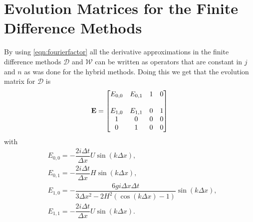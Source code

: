 \section{Evolution Matrices for the Finite Difference Methods}

By using \eqref{eqn:fourierfactor} all the derivative approximations in the finite difference methods $\mathcal{D}$ and $\mathcal{W}$ can be written as operators that are constant in $j$ and $n$ as was done for the hybrid methods. Doing this we get that the evolution matrix for $\mathcal{D}$ is 
\begin{equation}
\label{eqn:AppEvolD}
\mathbf{E} = \begin{bmatrix}
{E}_{0,0} & {E}_{0,1}  & 1 &0 \\ \\
{E}_{1,0} & {E}_{1,1}  & 0 &1 \\
1  & 0  &0 &0 \\
0  & 1  &0 &0 
\end{bmatrix} 
\end{equation}
with
\begin{align*}
&{E}_{0,0} = -  \dfrac{2 i\Delta t }{\Delta x} U\sin\left(k \Delta x\right) , \\
&{E}_{0,1} = -  \dfrac{2 i\Delta t}{\Delta x} H \sin\left(k \Delta x\right),\\
& {E}_{1,0} =-\dfrac{6 gi \Delta x\Delta t}{3 \Delta x^2 -2{H^2} \left( \cos\left(k \Delta x\right) - 1 \right)}{ \sin\left(k \Delta x\right)}, \\
& {E}_{1,1} =-\dfrac{2i \Delta t }{\Delta x} U \sin\left(k \Delta x\right).
\end{align*}



